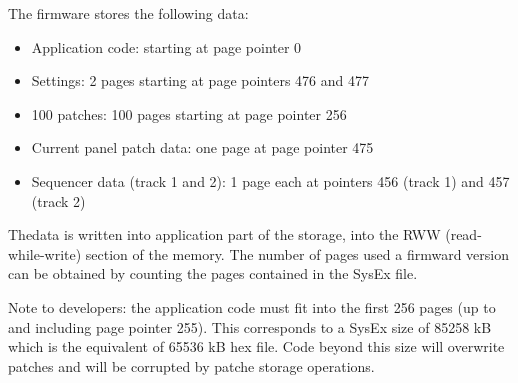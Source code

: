 The firmware stores the following data:
\begin{itemize}
  \item Application code: starting at page pointer 0
  \item Settings: 2 pages starting at page pointers 476 and 477 
  \item 100 patches: 100 pages starting at page pointer 256
  \item Current panel patch data: one page at page pointer 475
  \item Sequencer data (track 1 and 2): 1 page each at pointers 456 (track 1) and 457 (track 2)
\end{itemize}

Thedata is written into application part of the storage, into the RWW (read-while-write) section of the memory. The number of pages used a firmward version can be obtained by counting the pages contained in the SysEx file.

Note to developers: the application code must fit into the first 256 pages (up to and including page pointer 255). This corresponds to a SysEx size of 85258 kB which is the equivalent of 65536 kB hex file. Code beyond this size will overwrite patches and will be corrupted by patche storage operations.
